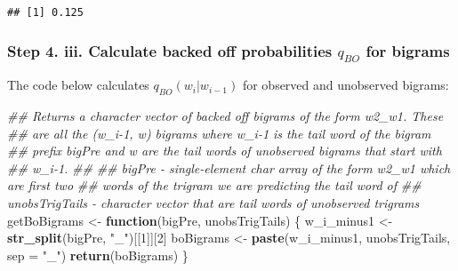 \documentclass[
]{article}
\newenvironment{Shaded}{\begin{snugshade}}{\end{snugshade}}
\newcommand{\CommentTok}[1]{\textcolor[rgb]{0.56,0.35,0.01}{\textit{#1}}}
\newcommand{\ControlFlowTok}[1]{\textcolor[rgb]{0.13,0.29,0.53}{\textbf{#1}}}
\newcommand{\DataTypeTok}[1]{\textcolor[rgb]{0.13,0.29,0.53}{#1}}
\newcommand{\DecValTok}[1]{\textcolor[rgb]{0.00,0.00,0.81}{#1}}
\newcommand{\KeywordTok}[1]{\textcolor[rgb]{0.13,0.29,0.53}{\textbf{#1}}}
\newcommand{\NormalTok}[1]{#1}
\newcommand{\StringTok}[1]{\textcolor[rgb]{0.31,0.60,0.02}{#1}}
\begin{document}
\begin{verbatim}
## [1] 0.125
\end{verbatim}

\hypertarget{step-4.-iii.-calculate-backed-off-probabilities-q_bo-for-bigrams}{%
\subsubsection{\texorpdfstring{Step 4. iii. Calculate backed off
probabilities \(q_{BO}\) for
bigrams}{Step 4. iii. Calculate backed off probabilities q\_\{BO\} for bigrams}}\label{step-4.-iii.-calculate-backed-off-probabilities-q_bo-for-bigrams}}

The code below calculates \(q_{BO}(w_i|w_{i−1})\) for observed and
unobserved bigrams:

\begin{Shaded}
\begin{Highlighting}[]
\CommentTok{\#\# Returns a character vector of backed off bigrams of the form w2\_w1. These }
\CommentTok{\#\# are all the (w\_i{-}1, w) bigrams where w\_i{-}1 is the tail word of the bigram}
\CommentTok{\#\# prefix bigPre and w are the tail words of unobserved bigrams that start with}
\CommentTok{\#\# w\_i{-}1.}
\CommentTok{\#\#}
\CommentTok{\#\# bigPre {-} single{-}element char array of the form w2\_w1 which are first two}
\CommentTok{\#\#          words of the trigram we are predicting the tail word of}
\CommentTok{\#\# unobsTrigTails {-} character vector that are tail words of unobserved trigrams}
\NormalTok{getBoBigrams \textless{}{-}}\StringTok{ }\ControlFlowTok{function}\NormalTok{(bigPre, unobsTrigTails) \{}
\NormalTok{    w\_i\_minus1 \textless{}{-}}\StringTok{ }\KeywordTok{str\_split}\NormalTok{(bigPre, }\StringTok{"\_"}\NormalTok{)[[}\DecValTok{1}\NormalTok{]][}\DecValTok{2}\NormalTok{]}
\NormalTok{    boBigrams \textless{}{-}}\StringTok{ }\KeywordTok{paste}\NormalTok{(w\_i\_minus1, unobsTrigTails, }\DataTypeTok{sep =} \StringTok{"\_"}\NormalTok{)}
    \KeywordTok{return}\NormalTok{(boBigrams)}
\NormalTok{\}}
\end{Highlighting}
\end{Shaded}
\end{document}
